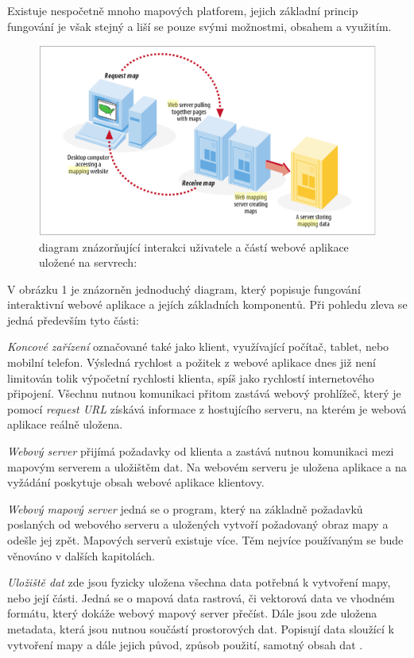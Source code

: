 Existuje nespočetně mnoho mapových platforem, jejich základní princip fungování je však stejný a liší se pouze svými možnostmi, obsahem a využitím.  

\begin{figure}[h!]
	\centering
	\includegraphics[width=1\textwidth]{../img/map-web-diagram.png}
	\caption{diagram znázorňující interakci uživatele a částí webové aplikace uložené na servrech: \cite{web_mapping}}
	\label{fig:WPS_class_diagram}
\end{figure}

V obrázku 1 je znázorněn jednoduchý diagram, který popisuje fungování interaktivní webové aplikace a jejích základních komponentů. Při pohledu zleva se jedná především tyto části:

\textit{Koncové zařízení} označované také jako klient, využívající počítač, tablet, nebo mobilní telefon. Výsledná rychlost a požitek z webové aplikace dnes již není limitován tolik výpočetní rychlosti klienta, spíš jako rychlostí internetového připojení. Všechnu nutnou komunikaci přitom zastává webový prohlížeč, který je pomocí \textit{request URL} získává informace z hostujícího serveru, na kterém je webová aplikace reálně uložena.

\textit{Webový server} přijímá požadavky od klienta a zastává nutnou komunikaci mezi mapovým serverem a uložištěm dat. Na webovém serveru je uložena aplikace a na vyžádání poskytuje obsah webové aplikace klientovy.  

\textit{Webový mapový server} jedná se o program, který na základně požadavků poslaných od webového serveru a uložených vytvoří požadovaný obraz mapy a odešle jej zpět. Mapových serverů existuje více. Těm nejvíce používaným se bude věnováno v dalších kapitolách.


\textit{Uložiště dat} zde jsou fyzicky uložena všechna data potřebná k vytvoření mapy, nebo její části. Jedná se o mapová data rastrová, či vektorová data ve vhodném formátu, který dokáže webový mapový server přečíst. Dále jsou zde uložena metadata, která jsou nutnou součástí prostorových dat. Popisují data sloužící k vytvoření mapy a dále jejich původ, způsob použití, samotný obsah dat \cite{web_mapping}.


